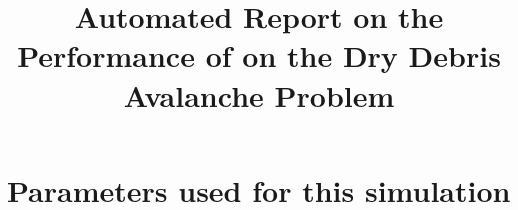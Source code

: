 \documentclass[11pt,a4paper]{article}
\begin{document}
 

\title{Automated Report on the Performance of \anuga{} on the Dry Debris Avalanche Problem}
\maketitle




\section{Parameters used for this simulation}






\end{document}
